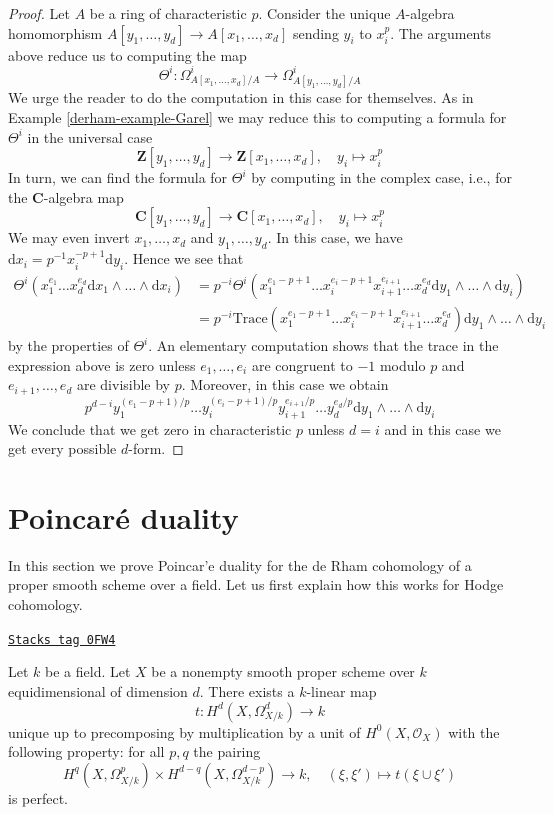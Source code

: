 \begin{proof}
\medskip\noindent
Let $A$ be a ring of characteristic $p$. Consider the unique $A$-algebra
homomorphism $A[y_1, \ldots, y_d] \to A[x_1, \ldots, x_d]$
sending $y_i$ to $x_i^p$. The arguments above
reduce us to computing the map
$$
\Theta^i : \Omega^i_{A[x_1, \ldots, x_d]/A} \to
\Omega^i_{A[y_1, \ldots, y_d]/A}
$$
We urge the reader to do the computation in this case for themselves.
As in Example \ref{derham-example-Garel} we may reduce this to computing
a formula for $\Theta^i$ in the universal case
$$
\mathbf{Z}[y_1, \ldots, y_d] \to \mathbf{Z}[x_1, \ldots, x_d],\quad
y_i \mapsto x_i^p
$$
In turn, we can find the formula for $\Theta^i$ by computing in the complex
case, i.e., for the $\mathbf{C}$-algebra map
$$
\mathbf{C}[y_1, \ldots, y_d] \to \mathbf{C}[x_1, \ldots, x_d],\quad
y_i \mapsto x_i^p
$$
We may even invert $x_1, \ldots, x_d$ and $y_1, \ldots, y_d$.
In this case, we have $\text{d}x_i = p^{-1} x_i^{- p + 1}\text{d}y_i$.
Hence we see that
\begin{align*}
\Theta^i(
x_1^{e_1} \ldots x_d^{e_d} \text{d}x_1 \wedge \ldots \wedge \text{d}x_i)
& =
p^{-i} \Theta^i(
x_1^{e_1 - p + 1} \ldots x_i^{e_i - p + 1} x_{i + 1}^{e_{i + 1}} \ldots
x_d^{e_d} \text{d}y_1 \wedge \ldots \wedge \text{d}y_i ) \\
& =
p^{-i} \text{Trace}(x_1^{e_1 - p + 1} \ldots x_i^{e_i - p + 1}
x_{i + 1}^{e_{i + 1}} \ldots x_d^{e_d})
\text{d}y_1 \wedge \ldots \wedge \text{d}y_i
\end{align*}
by the properties of $\Theta^i$. An elementary computation shows
that the trace in the expression above is zero unless
$e_1, \ldots, e_i$ are congruent to $-1$ modulo $p$
and $e_{i + 1}, \ldots, e_d$ are divisible by $p$.
Moreover, in this case we obtain
$$
p^{d - i} y_1^{(e_1 - p + 1)/p} \ldots y_i^{(e_i - p + 1)/p}
y_{i + 1}^{e_{i + 1}/p} \ldots y_d^{e_d/p}
\text{d}y_1 \wedge \ldots \wedge \text{d}y_i
$$
We conclude that we get zero in characteristic $p$ unless $d = i$
and in this case we get every possible $d$-form.
\end{proof}

\section{Poincar\'e duality}
\label{derham-section-poincare-duality}
In this section we prove Poincar'e duality for the de Rham cohomology
of a proper smooth scheme over a field. Let us first explain how this
works for Hodge cohomology.

\begin{lemma}
\label{derham-lemma-duality-hodge}
\href{https://stacks.math.columbia.edu/tag/0FW4}{\texttt{Stacks tag 0FW4}}

Let $k$ be a field. Let $X$ be a nonempty smooth proper scheme over $k$
equidimensional of dimension $d$. There exists a $k$-linear map
$$
t : H^d(X, \Omega^d_{X/k}) \longrightarrow k
$$
unique up to precomposing by multiplication by a unit of
$H^0(X, \mathcal{O}_X)$ with the following property: for all $p, q$ the pairing
$$
H^q(X, \Omega^p_{X/k}) \times H^{d - q}(X, \Omega^{d - p}_{X/k})
\longrightarrow
k, \quad
(\xi, \xi') \longmapsto t(\xi \cup \xi')
$$
is perfect.
\end{lemma}


